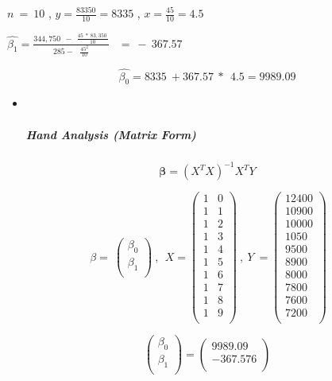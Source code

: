 \documentclass[
]{article}
\begin{document}
\(n\  = \ 10\) , \(y = \frac{83350}{10} = 8335\) ,
\(x = \frac{45}{10} = 4.5\)

\(\widehat{\beta_{1}} = \frac{344,750\ \  - \ \ \frac{45\ *\ 83,350\ }{10}}{285 - \ \ \ \frac{45^{2}}{10}}\ \ \)
\(= \  - \ 367.57\)

\[\widehat{\beta_{0}} = 8335\  + 367.57\ *\ \ 4.5 = 9989.09\]

\begin{itemize}
\item ~
  \hypertarget{hand-analysis-matrix-form}{%
  \subparagraph{\texorpdfstring{\textbf{Hand Analysis (Matrix
  Form)}}{Hand Analysis (Matrix Form)}}\label{hand-analysis-matrix-form}}
\end{itemize}

\[\mathbf{\beta} = {(X^{T}X)}^{- 1}X^{T}Y\]

\[\ \beta = \ \begin{pmatrix}
\beta_{0} \\
\beta_{1} \\
\end{pmatrix}\ ,\ \ X = \begin{pmatrix}
1 & 0 \\
1 & 1 \\
1 & 2 \\
1 & 3 \\
1 & 4 \\
1 & 5 \\
1 & 6 \\
1 & 7 \\
1 & 8 \\
1 & 9 \\
\end{pmatrix}\ ,\ Y\  = \begin{pmatrix}
12400 \\
10900 \\
10000 \\
1050 \\
9500 \\
8900 \\
8000 \\
7800 \\
7600 \\
7200 \\
\end{pmatrix}\]

\[\begin{pmatrix}
\beta_{0} \\
\beta_{1} \\
\end{pmatrix} = \begin{pmatrix}
9989.09 \\
 - 367.576 \\
\end{pmatrix}\]
\end{document}
